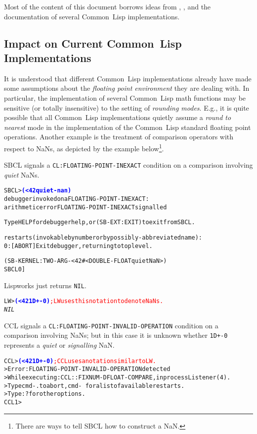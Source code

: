 \documentclass[10pt,fleqn]{article}
\newcommand{\CL}{\textsf{Common~Lisp}}
\newcommand{\code}[1]{\texttt{#1}}
\newcommand{\codeprompt}[1]{\textcolor{blue}{\textbf{#1}}}
\begin{document}
\vspace*{3mm}

Most of the content of this document borrows ideas from
\cite{IEEE-754}, \cite{C18}, and the documentation of
several \CL{} implementations.


\subsection{Impact on Current \CL{} Implementations}

It is understood that different \CL{} implementations already have
made some assumptions about the \emph{floating point environment} they
are dealing with.  In particular, the implementation of several \CL{}
math functions may be sensitive (or totally insensitive) to the
setting of \emph{rounding modes}.  E.g., it is quite possible that all
\CL{} implementations quietly assume a \emph{round to nearest} mode in
the implementation of the \CL{} standard floating point operations.
Another example is the treatment of comparison operators with respect
to NaNs, as depicted by the example below\footnote{There are ways to
  tell SBCL how to construct a NaN.}.

\vspace*{3mm}

\noindent
SBCL signals a \code{CL:FLOATING-POINT-INEXACT} condition on a
comparison involving \emph{quiet} NaNs.
\begin{alltt}
SBCL> \codeprompt{(< 42 quiet-nan)}
debugger invoked on a FLOATING-POINT-INEXACT:
  arithmetic error FLOATING-POINT-INEXACT signalled

Type HELP for debugger help, or (SB-EXT:EXIT) to exit from SBCL.

restarts (invokable by number or by possibly-abbreviated name):
  0: [ABORT] Exit debugger, returning to top level.

(SB-KERNEL:TWO-ARG-< 42 #<DOUBLE-FLOAT quiet NaN>)
SBCL 0]
\end{alltt}

\vspace*{3mm}

\noindent
Lispworks just returns \code{NIL}.
\begin{alltt}
LW> \codeprompt{(< 42 1D+-0)} \textcolor{red}{; LW uses this notation to denote NaNs.}
\textit{NIL}
\end{alltt}

\vspace*{3mm}

\noindent
CCL signals a \code{CL:FLOATING-POINT-INVALID-OPERATION} condition on a
comparison involving NaNs; but in this case it is unknown whether
\code{1D+-0} represents a \emph{quiet} or \emph{signalling} NaN.
\begin{alltt}
CCL> \codeprompt{(< 42 1D+-0)} \textcolor{red}{; CCL uses a notation similar to LW.}
> Error: FLOATING-POINT-INVALID-OPERATION detected
> While executing: CCL::FIXNUM-DFLOAT-COMPARE, in process Listener(4).
> Type cmd-. to abort, cmd-\ for a list of available restarts.
> Type :? for other options.
CCL 1 > 
\end{alltt}
\end{document}
